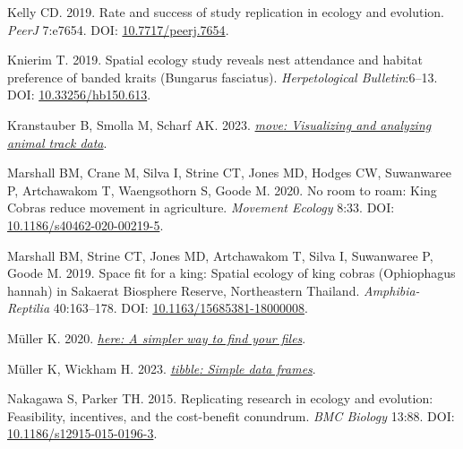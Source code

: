 \documentclass[10pt,a4paper]{article}
\newlength{\cslhangindent}
\newlength{\cslentryspacingunit} %
\newenvironment{CSLReferences}[2] %
 {%
  \setlength{\parindent}{0pt}
  \ifodd #1
  \let\oldpar\par
  \def\par{\hangindent=\cslhangindent\oldpar}
  \fi
  \setlength{\parskip}{#2\cslentryspacingunit}
 }%
 {}
\begin{document}
\begin{CSLReferences}{1}{0}
\leavevmode{}%
Kelly CD. 2019. Rate and success of study replication in ecology and evolution. \emph{PeerJ} 7:e7654. DOI: \href{https://doi.org/10.7717/peerj.7654}{10.7717/peerj.7654}.

\leavevmode{}%
Knierim T. 2019. Spatial ecology study reveals nest attendance and habitat preference of banded kraits ({Bungarus} fasciatus). \emph{Herpetological Bulletin}:6--13. DOI: \href{https://doi.org/10.33256/hb150.613}{10.33256/hb150.613}.

\leavevmode{}%
Kranstauber B, Smolla M, Scharf AK. 2023. \emph{\href{https://CRAN.R-project.org/package=move}{{move}: Visualizing and analyzing animal track data}}.

\leavevmode{}%
Marshall BM, Crane M, Silva I, Strine CT, Jones MD, Hodges CW, Suwanwaree P, Artchawakom T, Waengsothorn S, Goode M. 2020. No room to roam: {King} {Cobras} reduce movement in agriculture. \emph{Movement Ecology} 8:33. DOI: \href{https://doi.org/10.1186/s40462-020-00219-5}{10.1186/s40462-020-00219-5}.

\leavevmode{}%
Marshall BM, Strine CT, Jones MD, Artchawakom T, Silva I, Suwanwaree P, Goode M. 2019. Space fit for a king: Spatial ecology of king cobras ({Ophiophagus} hannah) in {Sakaerat} {Biosphere} {Reserve}, {Northeastern} {Thailand}. \emph{Amphibia-Reptilia} 40:163--178. DOI: \href{https://doi.org/10.1163/15685381-18000008}{10.1163/15685381-18000008}.

\leavevmode{}%
Müller K. 2020. \emph{\href{https://CRAN.R-project.org/package=here}{{here}: A simpler way to find your files}}.

\leavevmode{}%
Müller K, Wickham H. 2023. \emph{\href{https://CRAN.R-project.org/package=tibble}{{tibble}: Simple data frames}}.

\leavevmode{}%
Nakagawa S, Parker TH. 2015. Replicating research in ecology and evolution: Feasibility, incentives, and the cost-benefit conundrum. \emph{BMC Biology} 13:88. DOI: \href{https://doi.org/10.1186/s12915-015-0196-3}{10.1186/s12915-015-0196-3}.


\end{CSLReferences}
\end{document}

